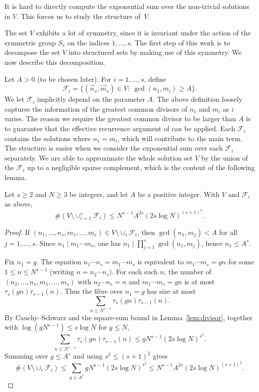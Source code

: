It is hard to directly compute the exponential sum over
the non-trivial solutions in $V$.
This forces us to study the structure of~$V$.

The set $V$ exhibits a lot of symmetry,
since it is invariant under the action of the symmetric group $S_s$ on the indices $1,\dots,s$.
The first step of this work is to decompose the set $V$
into structured sets by making use of this symmetry.
We now describe this decomposition.


Let $A>0$ (to be chosen later).  For $i=1,\ldots,s$,
define
\[
\mathscr{F}_i=\{(\vec{n}_s,\vec{m}_s)\in V:\ \gcd(n_1,m_i)\geq A\}.
\]
We let \(\mathscr{F}_i\) implicitly depend on the parameter \(A\).
The above definition loosely captures the information of the greatest common divisors of $n_1$ and $m_i$ as $i$ varies.
The reason we require the greatest common divisor 
to be larger than $A$ is to guarantee that the effective recurrence argument of \cite[\S3]{GTmob} can be applied. 
Each $\mathscr{F}_i$ contains the solutions where $n_1=m_i$, which will 
contribute to the main term. The structure is easier when we consider the exponential sum over 
each $\mathscr{F}_i$ separately.
We are able to approximate the whole solution set $V$ by the union of the $\mathscr{F}_i$ up to a negligible sparse complement, which is the content of the following lemma.
\begin{lemma}\label{lem:sparse-complement}
Let \(s\geq 2\) and \(N\geq 3\) be integers, and let \(A\) be a positive integer. With \(V\) and \(\mathscr{F}_i\) as above,
\[
\#(V\setminus\cup_{i=1}^s\mathscr{F}_i)\leq N^{s-1}A^{2s}(2s\log N)^{(s+1)^2}.
\]
\end{lemma}

\begin{proof}
If $(n_1,\ldots,n_s,m_1,\ldots,m_s)\in V\setminus\cup_i\mathscr{F}_i$, then $\gcd(n_1,m_j)<A$ for all $j=1,\ldots,s$.
Since $n_1\mid m_1\cdots m_s$, one has $n_1\mid\prod_{j=1}^s\gcd(n_1,m_j)$, hence $n_1\leq A^s$.

Fix $n_1=g$.  The equation $n_1\cdots n_s=m_1\cdots m_s$ is equivalent to $m_1\cdots m_s=gn$ for some $1\leq n\leq N^{s-1}$ (writing $n=n_2\cdots n_s$).
For each such $n$, the number of $(n_2,\ldots,n_s,m_1,\ldots,m_s)$ with $n_2\cdots n_s=n$ and $m_1\cdots m_s=gn$ is at most $\tau_s(gn)\tau_{s-1}(n)$.
Thus the fibre over $n_1=g$ has size at most
\[
\sum_{n\leq N^{s-1}}\tau_s(gn)\tau_{s-1}(n).
\]
By Cauchy--Schwarz and the square-sum bound in Lemma~\ref{lem:divisor},
together with \(\log(gN^{s-1})\leq s\log N\) for \(g\leq N\),
\[
\sum_{n\leq N^{s-1}}\tau_s(gn)\tau_{s-1}(n)
\leq gN^{s-1}(2s\log N)^{s^2}.
\]
Summing over $g\leq A^s$ and using \(s^2\leq(s+1)^2\) gives
\[
\#(V\setminus\cup_i\mathscr{F}_i)
\leq \sum_{g\leq A^s} gN^{s-1}(2s\log N)^{s^2}
\leq N^{s-1}A^{2s}(2s\log N)^{(s+1)^2}.
\]
\end{proof}

